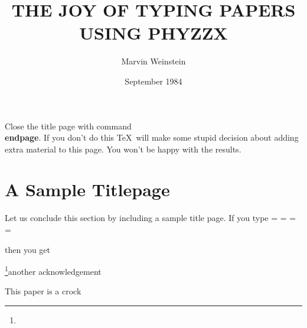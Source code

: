 Close the title page with command {\bf \\endpage}.
If you don't do this \TeX\ will make some stupid decision about
adding extra material to this page.
You won't be happy with the results.
 
\section{A Sample Titlepage}
 
Let us conclude this section by including a sample title page.
If you type \nextline
\newcount\lastpage \lastpage=\pagenumber
\newcount\lastchap \lastchap=\chapternumber
\newcount\lastsection \lastsection=\sectionnumber
\let\lastchapterlabel=\chapterlabel   \lastsection=\sectionnumber
 
\tc{\\pubnum=$\{$ \it  6666\bf $\}$}
\tcon{\\titlepage }
\tcon{\\SLAC}
\tcon{\\abstract}
\tcon{\\endpage}
 
then you get
 
\endpage
 
\date{September 1984}
\titlepage
\title{THE JOY OF TYPING PAPERS USING PHYZZX\doeack}
\author{Marvin Weinstein}
\SLAC\footnote{\dag}{another acknowledgement}
\address{Princeton}
\abstract
\centerline{This paper is a crock}
 
\endpage
 
